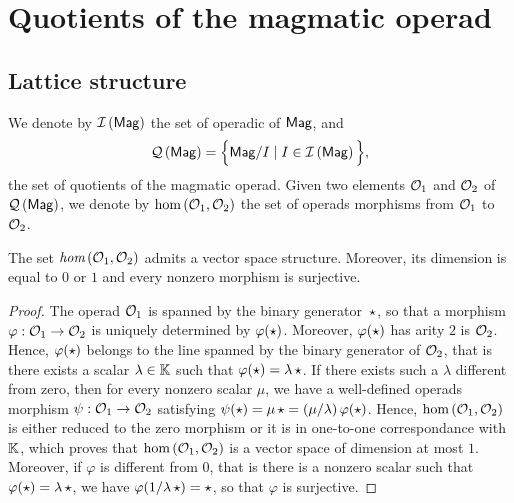 \section{Quotients of the magmatic operad}


\subsection{Lattice structure}

We denote by $\mathcal{I}\left(\mathsf{Mag}\right)$ the set of operadic of $\mathsf{Mag}$, and
\begin{equation} \label{equ:definition_of_QMag}
  \mathcal{Q}\left(\mathsf{Mag}\right) =\Big\{\mathsf{Mag}/ I\mid I\in\mathcal{I}\left(\mathsf{Mag}\right)\Big\},
  \end{equation}
the set of quotients of the magmatic operad. Given two elements $\mathcal{O}_1$
and $\mathcal{O}_2$ of $\mathcal{Q}\left(\mathsf{Mag}\right)$, we denote by $\text{hom}\left(\mathcal{O}_1,\mathcal{O}_2\right)$
the set of operads morphisms from $\mathcal{O}_1$ to $\mathcal{O}_2$.

\begin{Proposition} \label{prop:endomorphisms_of_magmatic_operads}
  The set $\emph{hom}\left(\mathcal{O}_1,\mathcal{O}_2\right)$ admits a vector space
  structure. Moreover, its dimension is equal to $0$ or $1$ and every
  nonzero morphism is surjective.
\end{Proposition}

\begin{proof}
  The operad $\mathcal{O}_1$ is spanned by the binary generator~$\operatorname{\star}$, so
  that a morphism $\varphi:\mathcal{O}_1\to\mathcal{O}_2$ is uniquely determined by
  $\varphi(\operatorname{\star})$. Moreover, $\varphi(\operatorname{\star})$ has arity $2$ is
  $\mathcal{O}_2$. Hence, $\varphi(\operatorname{\star})$ belongs to the line spanned by
  the binary generator of $\mathcal{O}_2$, that is there exists a scalar
  $\lambda\in\mathbb{K}$ such that $\varphi(\operatorname{\star})=\lambda\operatorname{\star}$. If there
  exists such a $\lambda$ different from zero, then for every nonzero
  scalar $\mu$, we have a well-defined operads morphism
  $\psi:\mathcal{O}_1\to\mathcal{O}_2$ satisfying $\psi(\operatorname{\star})=\mu\operatorname{\star}=\left(
  \mu/\lambda\right)\varphi(\operatorname{\star})$. Hence,
  $\text{hom}\left(\mathcal{O}_1,\mathcal{O}_2\right)$ is either reduced to the zero
  morphism or it is in one-to-one correspondance with $\mathbb{K}$, which
  proves that $\text{hom}\left(\mathcal{O}_1,\mathcal{O}_2\right)$ is a vector space
  of dimension at most $1$. Moreover, if $\varphi$ is different from $0$,
  that is there is a nonzero scalar such that
  $\varphi(\operatorname{\star})=\lambda\operatorname{\star}$, we have
  $\varphi(1/\lambda\operatorname{\star})=\operatorname{\star}$, so that $\varphi$ is
  surjective.
\end{proof}

